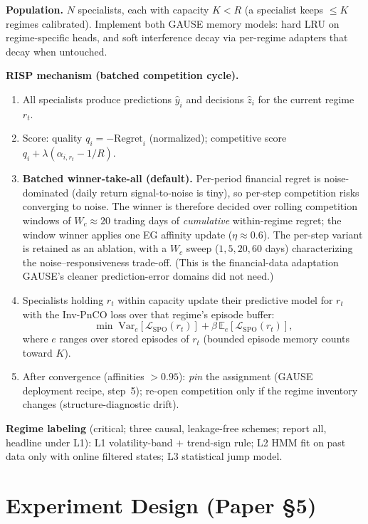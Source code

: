 \documentclass[11pt]{article}
\newcommand{\risp}{\textsc{RISP}}
\begin{document}
\noindent\textbf{Population.} $N$ specialists, each with capacity $K<R$ (a specialist keeps $\le K$ regimes calibrated). Implement both GAUSE memory models: hard LRU on regime-specific heads, and soft interference decay via per-regime adapters that decay when untouched.

\medskip\noindent\textbf{\risp{} mechanism (batched competition cycle).}
\begin{enumerate}
  \item All specialists produce predictions $\hat y_i$ and decisions $\hat z_i$ for the current regime $r_t$.
  \item Score: quality $q_i=-\mathrm{Regret}_i$ (normalized); competitive score $q_i+\lambda(\alpha_{i,r_t}-1/R)$.
  \item \textbf{Batched winner-take-all (default).} Per-period financial regret is noise-dominated (daily return signal-to-noise is tiny), so per-step competition risks converging to noise. The winner is therefore decided over rolling competition windows of $W_c\approx 20$ trading days of \emph{cumulative} within-regime regret; the window winner applies one EG affinity update ($\eta\approx0.6$). The per-step variant is retained as an ablation, with a $W_c$ sweep ($1, 5, 20, 60$ days) characterizing the noise--responsiveness trade-off. (This is the financial-data adaptation GAUSE's cleaner prediction-error domains did not need.)
  \item Specialists holding $r_t$ within capacity update their predictive model for $r_t$ with the Inv-PnCO loss over that regime's episode buffer:
  \[
    \min\; \mathrm{Var}_e\!\left[\mathcal L_{\mathrm{SPO}}(r_t)\right] + \beta\, \mathbb E_e\!\left[\mathcal L_{\mathrm{SPO}}(r_t)\right],
  \]
  where $e$ ranges over stored episodes of $r_t$ (bounded episode memory counts toward $K$).
  \item After convergence (affinities $>0.95$): \emph{pin} the assignment (GAUSE deployment recipe, step~5); re-open competition only if the regime inventory changes (structure-diagnostic drift).
\end{enumerate}

\noindent\textbf{Regime labeling} (critical; three causal, leakage-free schemes; report all, headline under L1):
L1 volatility-band $+$ trend-sign rule; L2 HMM fit on past data only with online filtered states; L3 statistical jump model.

\section{Experiment Design (Paper \S5)}
\end{document}
